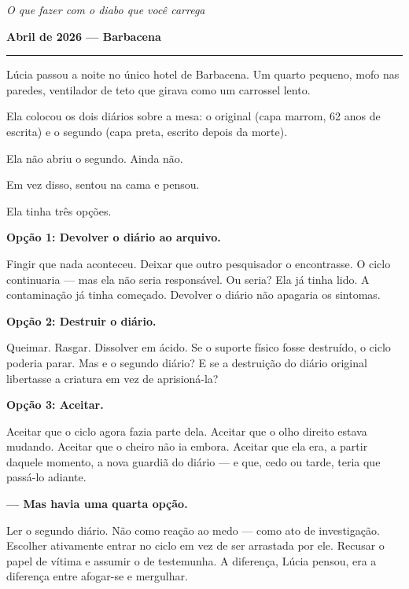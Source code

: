 
\noindent \textit{O que fazer com o diabo que você carrega}

\noindent \textbf{Abril de 2026 --- Barbacena}

\vspace{0.5em}\noindent\rule{\textwidth}{0.5pt}\vspace{0.5em}

\noindent Lúcia passou a noite no único hotel de Barbacena. Um quarto pequeno, mofo nas paredes, ventilador de teto que girava como um carrossel lento.

\noindent Ela colocou os dois diários sobre a mesa: o original (capa marrom, 62 anos de escrita) e o segundo (capa preta, escrito depois da morte).

\noindent Ela não abriu o segundo. Ainda não.

\noindent Em vez disso, sentou na cama e pensou.

\noindent Ela tinha três opções.

\noindent \textbf{Opção 1: Devolver o diário ao arquivo.}

\noindent Fingir que nada aconteceu. Deixar que outro pesquisador o encontrasse. O ciclo continuaria --- mas ela não seria responsável. Ou seria? Ela já tinha lido. A contaminação já tinha começado. Devolver o diário não apagaria os sintomas.

\noindent \textbf{Opção 2: Destruir o diário.}

\noindent Queimar. Rasgar. Dissolver em ácido. Se o suporte físico fosse destruído, o ciclo poderia parar. Mas e o segundo diário? E se a destruição do diário original libertasse a criatura em vez de aprisioná-la?

\noindent \textbf{Opção 3: Aceitar.}

\noindent Aceitar que o ciclo agora fazia parte dela. Aceitar que o olho direito estava mudando. Aceitar que o cheiro não ia embora. Aceitar que ela era, a partir daquele momento, a nova guardiã do diário --- e que, cedo ou tarde, teria que passá-lo adiante.

\noindent \textbf{--- Mas havia uma quarta opção.}

\noindent Ler o segundo diário. Não como reação ao medo — como ato de investigação. Escolher ativamente entrar no ciclo em vez de ser arrastada por ele. Recusar o papel de vítima e assumir o de testemunha. A diferença, Lúcia pensou, era a diferença entre afogar-se e mergulhar.

